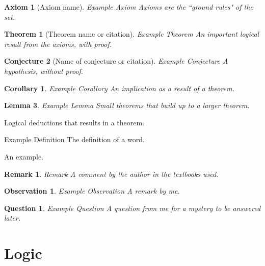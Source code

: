 \documentclass[12pt, english]{book}
\theoremstyle{break}
\newtheorem{axiom}{Axiom}[chapter]
\newtheorem{thm}{Theorem}[section]
\newtheorem{cor}{Corollary}[thm]
\newtheorem{lem}[thm]{Lemma}
\newtheorem{conj}[thm]{Conjecture}
\theoremstyle{plain}
\newtheorem*{rmk}{Remark}
\newtheorem*{obs}{Observation}
\newtheorem*{qtn}{Question}
\begin{document}
	\begin{axiom}[Axiom name]{Example Axiom}
		Axioms are the ``ground rules" of the set.
	\end{axiom}

	\begin{thm}[Theorem name or citation]{Example Theorem}
		An important logical result from the axioms, with proof.
	\end{thm}

	\begin{conj}[Name of conjecture or citation]{Example Conjecture}
		A hypothesis, without proof.
	\end{conj}
	
	\begin{cor}{Example Corollary}
		An implication as a result of a theorem.
	\end{cor}

	\begin{lem}{Example Lemma}
		Small theorems that build up to a larger theorem. 
	\end{lem}
	
	\begin{proof*}
		Logical deductions that results in a theorem.
	\end{proof*}

	\begin{definition}[Word]{Example Definition}
		The definition of a word.
	\end{definition}	

	\begin{example}
		An example.
	\end{example}

	\begin{rmk}{Remark}
		A comment by the author in the textbooks used.
	\end{rmk}
	
	\begin{obs}{Example Observation}
		A remark by me.
	\end{obs}

	\begin{qtn}{Example Question}
		A question from me for a mystery to be answered later. 
	\end{qtn}

	
	\section*{}
	\tableofcontents
	
	\mainmatter
	\part{Logic}
	
\end{document}
